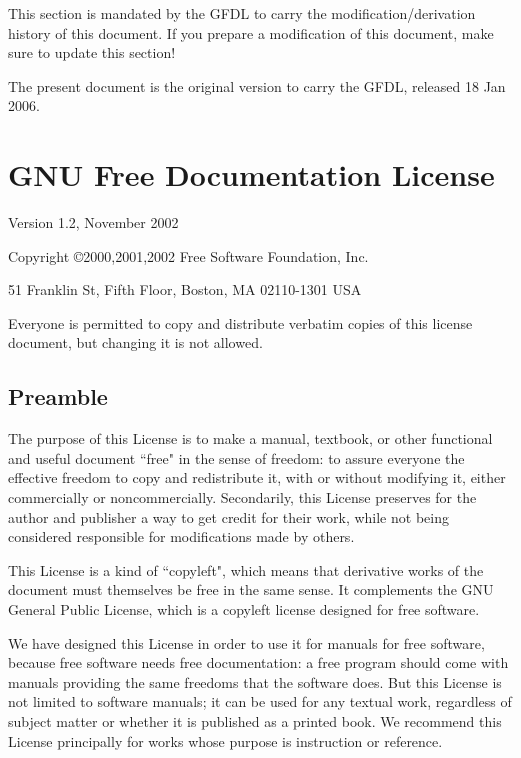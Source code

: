 \documentclass[12pt]{book}
\numberwithin{exc}{section}
\numberwithin{figure}{section}
\numberwithin{equation}{theorem}
\begin{document}
This section is mandated by the GFDL to carry the modification/derivation
history of this document. If you prepare a modification of this
document, make sure to update this section!

The present document is the original version
to carry the GFDL, released 18 Jan 2006.

\setcounter{secnumdepth}{-1}
\chapter{GNU Free Documentation License}
\label{label_fdl}


 \begin{center}

       Version 1.2, November 2002


 Copyright \copyright 2000,2001,2002  Free Software Foundation, Inc.
 
 \bigskip
 
     51 Franklin St, Fifth Floor, Boston, MA  02110-1301  USA
  
 \bigskip
 
 Everyone is permitted to copy and distribute verbatim copies
 of this license document, but changing it is not allowed.
\end{center}

\section{Preamble}

The purpose of this License is to make a manual, textbook, or other
functional and useful document ``free" in the sense of freedom: to
assure everyone the effective freedom to copy and redistribute it,
with or without modifying it, either commercially or noncommercially.
Secondarily, this License preserves for the author and publisher a way
to get credit for their work, while not being considered responsible
for modifications made by others.

This License is a kind of ``copyleft", which means that derivative
works of the document must themselves be free in the same sense.  It
complements the GNU General Public License, which is a copyleft
license designed for free software.

We have designed this License in order to use it for manuals for free
software, because free software needs free documentation: a free
program should come with manuals providing the same freedoms that the
software does.  But this License is not limited to software manuals;
it can be used for any textual work, regardless of subject matter or
whether it is published as a printed book.  We recommend this License
principally for works whose purpose is instruction or reference.
\end{document}
